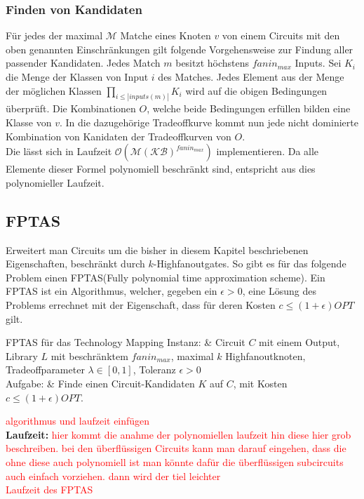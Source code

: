 \documentclass[11pt, a4paper, german]{article}
\newcommand{\TM}{Technology Mapping }
\begin{document}
\subsubsection{Finden von Kandidaten} 
Für jedes der maximal $\mathcal{M}$ Matche eines Knoten $v$ von einem Circuits mit den oben genannten Einschränkungen gilt folgende Vorgehensweise zur Findung aller passender Kandidaten. Jedes Match $m$ besitzt höchstens $fanin_{max}$ Inputs. Sei $K_i$ die Menge der Klassen von Input $i$ des Matches. Jedes Element aus der Menge der möglichen Klassen $\prod_{i\leq |inputs(m)|} K_i $ wird auf die obigen Bedingungen überprüft. Die Kombinationen $O$, welche beide Bedingungen erfüllen bilden eine Klasse von $v$. In die  dazugehörige Tradeoffkurve kommt nun jede nicht dominierte Kombination von Kanidaten der Tradeoffkurven von $O$. \\
Die lässt sich in Laufzeit $\mathcal{O}(\mathcal{M}(\mathcal{KB})^{fanin_{max}} )$ implementieren. Da alle Elemente dieser Formel polynomiell beschränkt sind, entspricht aus dies polynomieller Laufzeit.
 
\subsection{FPTAS}
\label{subsec:fptas}
Erweitert man Circuits um die bisher in diesem Kapitel beschriebenen Eigenschaften, beschränkt durch $k$-Highfanoutgates. So gibt es für das folgende Problem einen FPTAS(Fully polynomial time approximation scheme). Ein FPTAS ist ein Algorithmus, welcher, gegeben ein $\epsilon > 0$, eine Lösung des Problems errechnet mit der Eigenschaft, dass für deren Kosten $c \leq (1+\epsilon)OPT$ gilt. \\
 \begin{problem}[framed]{FPTAS für das \TM}
  Instanz:  & Circuit $C$ mit einem Output, Library $L$ mit beschr\"anktem $fanin_{max}$, maximal $k$ Highfanoutknoten, Tradeoffparameter $\lambda \in [0,1]$, Toleranz $\epsilon > 0$ \\
  Aufgabe: &  Finde einen Circuit-Kandidaten $K$ auf $C$, mit Kosten $c \leq (1+\epsilon)OPT$.
\end{problem}
\textcolor{red}{algorithmus und laufzeit einfügen}\\
{\bf Laufzeit: }
\textcolor{red}{hier kommt die anahme der polynomiellen laufzeit hin diese hier grob beschreiben. bei den überflüssigen Circuits kann man darauf eingehen, dass die ohne diese auch polynomiell ist man könnte dafür die überflüssigen subcircuits auch einfach vorziehen. dann wird der tiel leichter}\\
\textcolor{red}{Laufzeit des FPTAS}
\end{document}
